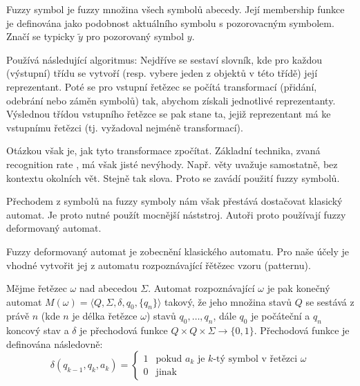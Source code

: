 \documentclass[a4paper,10pt]{article}
\begin{document}
\begin{definition}
Fuzzy symbol je fuzzy množina všech symbolů abecedy. Její membership funkce je definována jako podobnost aktuálního symbolu s pozorovacným symbolem. Značí se typicky $\widetilde{y}$ pro pozorovaný symbol $y$.
\end{definition}

Používá následující algoritmus: Nejdříve se sestaví slovník, kde pro každou (výstupní) třídu se vytvoří (resp. vybere jeden z objektů v této třídě) její reprezentant. Poté se pro vstupní řetězec se počítá  transformací (přidání, odebrání nebo záměn symbolů) tak, abychom získali jednotlivé reprezentanty. Výslednou třídou vstupního řetězce se pak stane ta, jejiž reprezentant má ke vstupnímu řetězci  (tj. vyžadoval nejméně transformací).

Otázkou však je, jak tyto transformace zpočítat. Základní technika, zvaná recognition rate , má však jisté nevýhody.  Např. věty uvažuje samostatně, bez kontextu okolních vět. Stejně tak slova. Proto se zavádí použití fuzzy symbolů.

Přechodem z  symbolů na fuzzy symboly nám však přestává dostačovat klasický automat. Je proto nutné použít mocnější náststroj. Autoři proto používají fuzzy deformovaný automat.

Fuzzy deformovaný automat je zobecnění klasického automatu. Pro naše účely je vhodné vytvořit jej z automatu rozpoznávající řětězec vzoru (patternu). 

\begin{definition}
  Mějme řetězec $\omega$ nad abecedou $\Sigma$. Automat rozpoznávající $\omega$ je pak konečný automat $M(\omega) = \langle Q, \Sigma, \delta, q_0, \{ q_n \} \rangle$ takový, že jeho množina stavů $Q$ se sestává z právě $n$ (kde $n$ je délka řetězce $\omega$) stavů $q_0, \dots, q_n$, dále $q_0$ je počáteční a $q_n$ koncový stav a $\delta$ je přechodová funkce $Q \times Q \times \Sigma \rightarrow \{0, 1\}$. Přechodová funkce je definována následovně:
  $$
  \delta(q_{k-1}, q_k, a_k) = 
  \begin{cases}
      1	&\text{pokud $a_k$ je $k$-tý symbol v řetězci $\omega$} \\
      0	&\text{jinak}
  \end{cases}
  $$
\end{definition}
\end{document}
